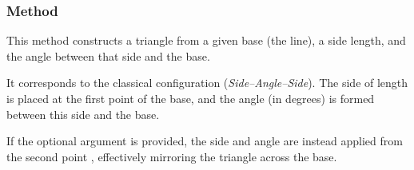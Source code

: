 \begin{minipage}{.5\textwidth}
  \begin{center}
  \end{center}
\end{minipage}
\begin{minipage}{.5\textwidth}
\begin{tkzexample}
\end{tkzexample}
\end{minipage}

\subsubsection{Method }
\label{ssub:_line_sas_d_an}

This method constructs a triangle from a given base (the line), a side length, and the angle between that side and the base.

\medskip
\noindent
It corresponds to the classical  configuration (\textit{Side–Angle–Side}). The side of length  is placed at the first point  of the base, and the angle  (in degrees) is formed between this side and the base.

\medskip
\noindent
If the optional argument  is provided, the side and angle are instead applied from the second point , effectively mirroring the triangle across the base.

\vspace{1em}
  \begin{center}
  \end{center}

